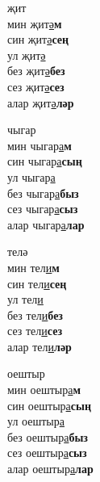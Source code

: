 \begin{multicols}{4}
\begin{enumerate}
\begin{minipage}{\linewidth}
    \item
    җит\\
    мин җит\underline{ә}\textbf{м}\\
    син җит\underline{ә}\textbf{сең}\\
    ул җит\underline{ә}\\
    без җит\underline{ә}\textbf{без}\\
    сез җит\underline{ә}\textbf{сез}\\
    алар җит\underline{ә}\textbf{ләр}\\
\end{minipage}

\begin{minipage}{\linewidth}
    \item
    чыгар\\
    мин чыгар\underline{а}\textbf{м}\\
    син чыгар\underline{а}\textbf{сың}\\
    ул чыгар\underline{а}\\
    без чыгар\underline{а}\textbf{быз}\\
    сез чыгар\underline{а}\textbf{сыз}\\
    алар чыгар\underline{а}\textbf{лар}\\
\end{minipage}

\begin{minipage}{\linewidth}
    \item
    телә\\
    мин тел\underline{и}\textbf{м}\\
    син тел\underline{и}\textbf{сең}\\
    ул тел\underline{и}\\
    без тел\underline{и}\textbf{без}\\
    сез тел\underline{и}\textbf{сез}\\
    алар тел\underline{и}\textbf{ләр}\\
\end{minipage}

\begin{minipage}{\linewidth}
    \item
    оештыр\\
    мин оештыр\underline{а}\textbf{м}\\
    син оештыр\underline{а}\textbf{сың}\\
    ул оештыр\underline{а}\\
    без оештыр\underline{а}\textbf{быз}\\
    сез оештыр\underline{а}\textbf{сыз}\\
    алар оештыр\underline{а}\textbf{лар}\\
\end{minipage}


\end{enumerate}
\end{multicols}
